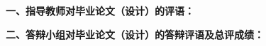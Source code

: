 
% 		

{

	{
        \bfseries {}
        \noindent 一、指导教师对毕业论文（设计）的评语：\\
    }
    {
        \vskip 20mm
    }
    {
        \bfseries {}
        \signature{指导教师（签名）}
    }
    {
        \bfseries {}
        \noindent 二、答辩小组对毕业论文（设计）的答辩评语及总评成绩：\\
    }
    {
        \vskip 20mm
    }
	\mbox{} \vfill

	{
		\bfseries
		\finaleval[~][~][~][~][~]

		\signature{负责人（签名）}
	}
}
